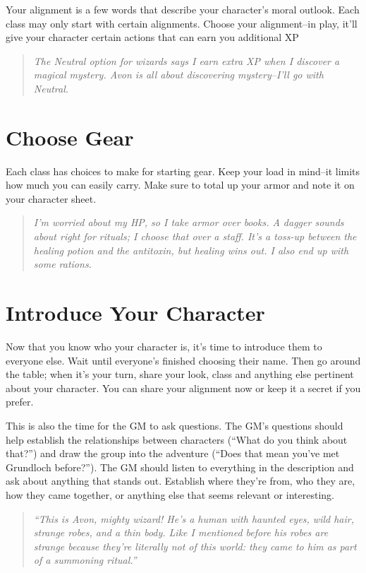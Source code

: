  Your alignment is a few words that describe your character's moral outlook. Each class may only start with certain alignments. Choose your alignment--in play, it'll give your character certain actions that can earn you additional XP


\begin{quote}
\emph{The Neutral option for wizards says I earn extra XP when I discover a magical mystery. Avon is all about discovering mystery--I'll go with Neutral.}
\end{quote}
\section{Choose Gear}


 Each class has choices to make for starting gear. Keep your load in mind--it limits how much you can easily carry. Make sure to total up your armor and note it on your character sheet.


\begin{quote}
\emph{I'm worried about my HP, so I take armor over books. A dagger sounds about right for rituals; I choose that over a staff. It's a toss-up between the healing potion and the antitoxin, but healing wins out. I also end up with some rations.}
\end{quote}
\section{Introduce Your Character}


 Now that you know who your character is, it's time to introduce them to everyone else. Wait until everyone's finished choosing their name. Then go around the table; when it's your turn, share your look, class and anything else pertinent about your character. You can share your alignment now or keep it a secret if you prefer.


 This is also the time for the GM to ask questions. The GM's questions should help establish the relationships between characters (``What do you think about that?'') and draw the group into the adventure (``Does that mean you've met Grundloch before?''). The GM should listen to everything in the description and ask about anything that stands out. Establish where they're from, who they are, how they came together, or anything else that seems relevant or interesting.


\begin{quote}
\emph{``This is Avon, mighty wizard! He's a human with haunted eyes, wild hair, strange robes, and a thin body. Like I mentioned before his robes are strange because they're literally not of this world: they came to him as part of a summoning ritual.''}
\end{quote}
